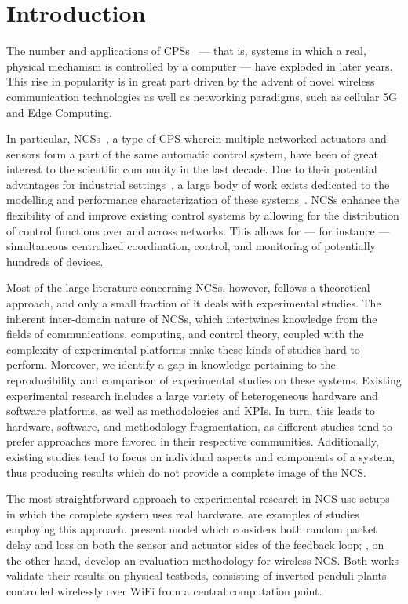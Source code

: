\section{Introduction}\label{sec:intro}


The number and applications of \acp{CPS}~\cite{Rajkumar2010CPS} --- that is, systems in which a real, physical mechanism is controlled by a computer --- have exploded in later years.
This rise in popularity is in great part driven by the advent of novel wireless communication technologies as well as networking paradigms, such as cellular 5G and Edge Computing.

In particular, \acp{NCS}~\cite{Gupta2010NCSOverview}, a type of \ac{CPS} wherein multiple networked actuators and sensors form a part of the same automatic control system, have been of great interest to the scientific community in the last decade.
Due to their potential advantages for industrial settings~\cite{Lu2015WSAN}, a large body of work exists dedicated to the modelling and performance characterization of these systems~\cite{Hespanha2007Survey,Zhang2013Survey,Zhang2016Survey}.
\Acp{NCS} enhance the flexibility of and improve existing control systems by allowing for the distribution of control functions over and across networks.
This allows for --- for instance --- simultaneous centralized coordination, control, and monitoring of potentially hundreds of devices.

Most of the large literature concerning \acp{NCS}, however, follows a theoretical approach, and only a small fraction of it deals with experimental studies.
The inherent inter-domain nature of \acp{NCS}, which intertwines knowledge from the fields of communications, computing, and control theory, coupled with the complexity of experimental platforms make these kinds of studies hard to perform.
Moreover, we identify a gap in knowledge pertaining to the reproducibility and comparison of experimental studies on these systems.
Existing experimental research includes a large variety of heterogeneous hardware and software platforms, as well as methodologies and \acp{KPI}.
In turn, this leads to hardware, software, and methodology fragmentation, as different studies tend to prefer approaches more favored in their respective communities.
Additionally, existing studies tend to focus on individual aspects and components of a system, thus producing results which do not provide a complete image of the \ac{NCS}.

The most straightforward approach to experimental research in \ac{NCS} use setups in which the complete system uses real hardware.
\cite{Drew2005NCSWLAN,Baumann2018LowPower} are examples of studies employing this approach.
\textcite{Drew2005NCSWLAN} present  model which considers both random packet delay and loss on both the sensor and actuator sides of the feedback loop; \textcite{Baumann2018LowPower}, on the other hand, develop an evaluation methodology for wireless \ac{NCS}.
Both works validate their results on physical testbeds, consisting of inverted penduli plants controlled wirelessly over WiFi from a central computation point.

